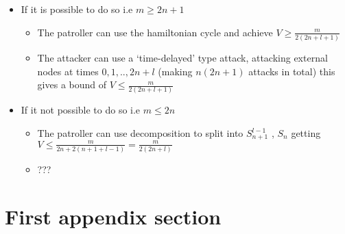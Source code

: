 \documentclass[a4paper,10pt]{article}
\theoremstyle{definition}
\theoremstyle{definition}
\theoremstyle{remark}
\theoremstyle{definition}
\begin{document}
\begin{itemize}
\item If it is possible to do so i.e $m \geq 2n+1$
  \begin{itemize}
  \item The patroller can use the hamiltonian cycle and achieve $V \geq \frac{m}{2(2n+l+1)}$
  
  \item The attacker can use a `time-delayed' type attack, attacking external nodes at times $0,1,..,2n+l$ (making $n(2n+1)$ attacks in total) this gives a bound of $V \leq \frac{m}{2(2n+l+1)}$
  \end{itemize}

\item If it not possible to do so i.e $m \leq 2n$
 \begin{itemize}
 \item The patroller can use decomposition to split into $S_{n+1}^{l-1}$ , $S_{n}$ getting $V \leq \frac{m}{2n+2(n+1+l-1)}=\frac{m}{2(2n+l)}$
 
 \item ???
 \end{itemize}
\end{itemize}




\appendix
{}
\appendixpage
\addappheadtotoc
\section{First appendix section}
\end{document}

